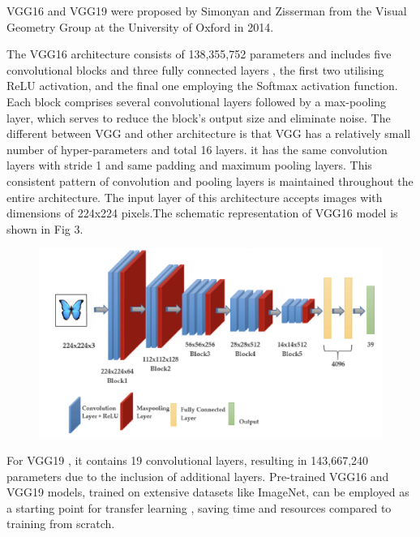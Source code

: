 \documentclass[10pt,twocolumn,letterpaper]{article}
\begin{document}
VGG16 and VGG19 were proposed by Simonyan and Zisserman from the Visual Geometry Group at the University of Oxford in 2014\cite{simonyan2014very}.

The VGG16 architecture consists of 138,355,752 parameters and includes 
five convolutional blocks and three fully connected layers ,
 the first two utilising ReLU activation, and the final one employing the Softmax activation 
 function. Each block comprises several convolutional layers followed by a max-pooling 
 layer, which serves to reduce the block's output size and eliminate noise.
 The different between VGG and other architecture is that VGG has a relatively small number of hyper-parameters and total 16 layers. 
 it has the same convolution layers with stride 1 and same padding and maximum pooling layers. 
 This consistent pattern of convolution and pooling layers is maintained throughout the entire architecture.
 The input layer of this architecture accepts images with dimensions of 224x224 pixels.The schematic representation of VGG16 model is shown in Fig 3.
\begin{figure}[h]
	\centering
	\includegraphics[width=\columnwidth]{vgg16}
	\caption{}
	\label{fig:svm-lr}
\end{figure}

 For VGG19 , it contains 19 convolutional layers, resulting in 143,667,240 parameters due to the inclusion of additional layers. Pre-trained VGG16 and VGG19 models, trained on extensive datasets like ImageNet, can be employed as a starting point for transfer learning , saving time and resources compared to training from scratch.
\end{document}
